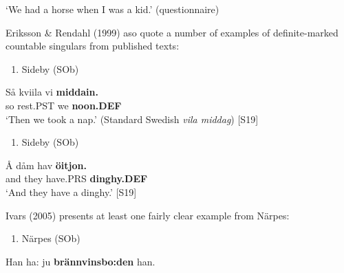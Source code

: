 ‘We had a horse when I was a kid.’ (questionnaire)
\z


Eriksson \& Rendahl (1999) aso quote a number of examples of definite-marked countable singulars from published texts:

\begin{enumerate} %
\item 
Sideby (SOb)

\end{enumerate} %
\ea\label{}
\gll Så  kviila  vi  \textbf{middain.} \\


so  rest.PST  we  \textbf{noon.DEF} \\ %


‘Then we took a nap.’ (Standard Swedish \textit{vila middag}) [S19]
\z

\begin{enumerate} %
\item 
Sideby (SOb)

\end{enumerate} %
\ea\label{}
\gll Å  dåm  hav  \textbf{öitjon.}\\


and  they  have.PRS  \textbf{dinghy.DEF}\\ %


‘And they have a dinghy.’ [S19]
\z

Ivars (2005) presents at least one fairly clear example from Närpes:

\begin{enumerate} %
\item 
Närpes (SOb)

\end{enumerate} %
\ea\label{}
\gll Han  ha:  ju  \textbf{brännvinsbo:den} han.  \\


